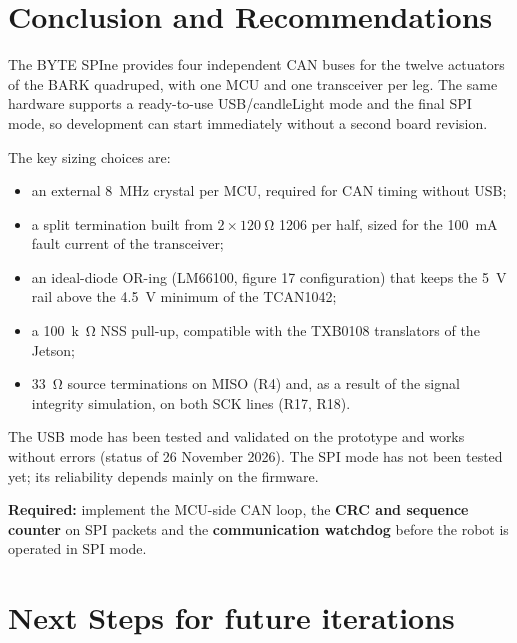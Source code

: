 \documentclass[11pt,a4paper]{article}
\newcommand{\required}[1]{\begin{reqbox}\textbf{\color{reqred}Required:} #1\end{reqbox}}
\begin{document}
\section{Conclusion and Recommendations}

The BYTE SPIne provides four independent CAN buses for the twelve actuators of the BARK
quadruped, with one MCU and one transceiver per leg. The same hardware supports a ready-to-use
USB/candleLight mode and the final SPI mode, so development can start immediately
without a second board revision.

The key sizing choices are:
\begin{itemize}
    \item an external \qty{8}{MHz} crystal per MCU, required for CAN timing without USB;
    \item a split termination built from $2\times\qty{120}{\ohm}$ 1206 per half, sized for the \qty{100}{mA} fault current
    of the transceiver;
    \item an ideal-diode OR-ing (LM66100, figure 17 configuration) that keeps the \qty{5}{V} rail above the
    \qty{4.5}{V} minimum of the TCAN1042;
    \item a \qty{100}{k\ohm} NSS pull-up, compatible with the TXB0108 translators of the Jetson;
    \item \qty{33}{\ohm} source terminations on MISO (R4) and, as a result of the signal integrity simulation,
    on both SCK lines (R17, R18).
\end{itemize}
The USB mode has been tested and validated on the prototype and works without errors
(status of 26 November 2026). The SPI mode has not been tested yet; its reliability depends
mainly on the firmware.

\required{implement the MCU-side CAN loop, the \textbf{CRC and sequence counter} on SPI
packets and the \textbf{communication watchdog} before the robot is operated in SPI mode.}

\section{Next Steps for future iterations}\label{sec:next}
\end{document}
